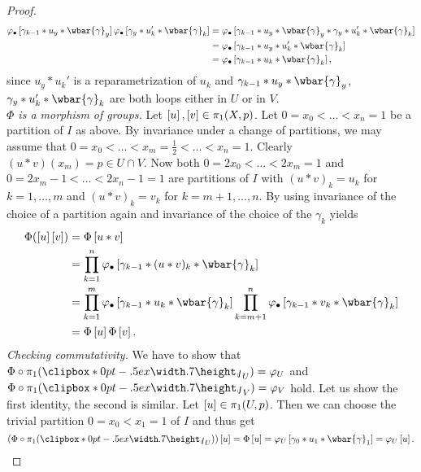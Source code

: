 \begin{proof}
	\begin{align*}
		\varphi_\bullet\sbr[0]{\gamma_{k - 1} \ast u_y \ast \wbar{\gamma}_y} \varphi_\bullet\sbr[0]{\gamma_y \ast u_k' \ast \wbar{\gamma}_k} &= \varphi_\bullet\sbr[0]{\gamma_{k - 1} \ast u_y \ast \wbar{\gamma}_y \ast \gamma_y \ast u_k' \ast \wbar{\gamma}_k}\\
		&= \varphi_\bullet\sbr[0]{\gamma_{k - 1} \ast u_y \ast u_k' \ast \wbar{\gamma}_k}\\
		&= \varphi_\bullet\sbr[0]{\gamma_{k - 1} \ast u_k \ast \wbar{\gamma}_k},
	\end{align*}
	\noindent since $u_y \ast u_k'$ is a reparametrization of $u_k$ and $\gamma_{k - 1} \ast u_y \ast \wbar{\gamma}_y$, $\gamma_y \ast u_k' \ast \wbar{\gamma}_k$ are both loops either in $U$ or in $V$.\\
	\textit{$\Phi$ is a morphism of groups.} Let $\sbr{u},\sbr{v} \in \pi_1(X,p)$. Let $0 = x_0 < \dots < x_n = 1$ be a partition of $I$ as above. By invariance under a change of partitions, we may assume that $0 = x_0 < \dots < x_m = \frac{1}{2} < \dots < x_n = 1$. Clearly $(u \ast v)(x_m) = p \in U \cap V$. Now both $0 = 2x_0 < \dots < 2x_m = 1$ and $0 = 2x_m - 1 < \dots < 2x_n - 1 = 1$ are partitions of $I$ with $(u \ast v)_k = u_k$ for $k = 1,\dots,m$ and $(u \ast v)_k = v_k$ for $k = m + 1,\dots,n$. By using invariance of the choice of a partition again and invariance of the choice of the $\gamma_k$ yields
	\begin{align*}
		\Phi(\sbr{u}\sbr{v}) &= \Phi\sbr{u \ast v}\\
		&= \prod_{k = 1}^n \varphi_\bullet \sbr[0]{\gamma_{k - 1} \ast (u\ast v)_k \ast \wbar{\gamma}_k}\\
		&= \prod_{k = 1}^m \varphi_\bullet \sbr[0]{\gamma_{k - 1} \ast u_k \ast \wbar{\gamma}_k}\prod_{k = m + 1}^n \varphi_\bullet \sbr[0]{\gamma_{k - 1} \ast v_k \ast \wbar{\gamma}_k}\\
		&= \Phi\sbr{u}\Phi\sbr{v}. 
	\end{align*}
	\textit{Checking commutativity.} We have to show that $\Phi \circ \pi_1(\jota_U) = \varphi_U$ and $\Phi \circ \pi_1(\jota_V) = \varphi_V$ hold. Let us show the first identity, the second is similar. Let $\sbr{u} \in \pi_1(U,p)$. Then we can choose the trivial partition $0 = x_0 < x_1 = 1$ of $I$ and thus get
	\begin{equation*}
		(\Phi \circ \pi_1(\jota_U))\sbr{u} = \Phi\sbr{u} = \varphi_U\sbr[0]{\gamma_0 \ast u_1 \ast \wbar{\gamma}_1} = \varphi_U\sbr{u}.
	\end{equation*}

\end{proof}
